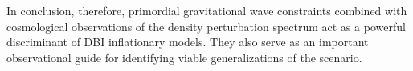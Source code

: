 In conclusion, therefore, primordial gravitational wave constraints 
combined with cosmological observations of the density perturbation
spectrum act as a powerful discriminant of DBI inflationary models. 
They also serve as an important 
observational guide for identifying viable 
generalizations of the scenario. 

